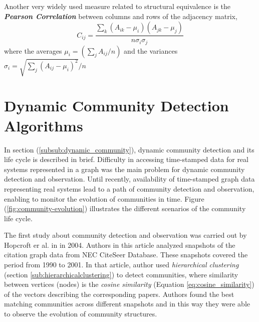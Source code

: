 Another very widely used measure related to structural equivalence is the \textbf{\textit{Pearson Correlation}} between columns and rows of the adjacency matrix,
\begin{equation}
C_{ij} = \dfrac{\sum\limits_{k} (A_{ik} - \mu_i) (A_{jk} - \mu_j)}{n \sigma_i \sigma_j}
\end{equation}
where the averages $\mu_i = (\sum\limits_j A_{ij} / n)$ and the variances $\sigma_i = \sqrt{\sum\limits_j (A_{ij} - \mu_i)^2} / n$

\section{Dynamic Community Detection Algorithms}\label{sec:dynamic_community_algorithms}
In section (\ref{subsub:dynamic_community}), dynamic community detection and its life cycle is described in brief. Difficulty in accessing time-stamped data for real systems represented in a graph was the main problem for dynamic community detection and observation. Until recently, availability of time-stamped graph data representing real systems lead to a path of community detection and observation, enabling to monitor the evolution of communities in time. Figure (\ref{fig:community-evolution}) illustrates the different scenarios of the community life cycle.

The first study about community detection and observation was carried out by Hopcroft er al. in  \cite{ref-52} in 2004. Authors in this article analyzed snapshots of the citation graph data from NEC CiteSeer Database. These snapshots covered the period from 1990 to 2001. In that article, author used \textit{hierarchical clustering} (section \ref{sub:hierarchicalclustering}) to detect communities, where similarity between vertices (nodes) is the \textit{cosine similarity} (Equation \ref{eq:cosine_similarity}) of the vectors describing the corresponding papers. Authors found the best matching communities across different snapshots and in this way they were able to observe the evolution of community structures.

